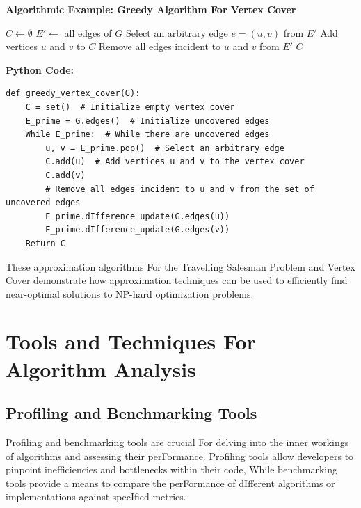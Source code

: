 \documentclass[12pt]{book} %
\begin{document}
\textbf{Algorithmic Example: Greedy Algorithm For Vertex Cover}

\begin{algorithm}
\caption{Greedy Algorithm For Vertex Cover}
\begin{algorithmic}[1]
    \State $C \gets \emptyset$ 
    \State $E' \gets$ all edges of $G$ 
        \State Select an arbitrary edge $e = (u, v)$ from $E'$
        \State Add vertices $u$ and $v$ to $C$
        \State Remove all edges incident to $u$ and $v$ from $E'$
    \EndWhile
    \State \Return $C$
\EndFunction
\end{algorithmic}
\end{algorithm}
\textbf{Python Code:}
\FloatBarrier
\begin{verbatim}
def greedy_vertex_cover(G):
    C = set()  # Initialize empty vertex cover
    E_prime = G.edges()  # Initialize uncovered edges
    While E_prime:  # While there are uncovered edges
        u, v = E_prime.pop()  # Select an arbitrary edge
        C.add(u)  # Add vertices u and v to the vertex cover
        C.add(v)
        # Remove all edges incident to u and v from the set of uncovered edges
        E_prime.dIfference_update(G.edges(u))
        E_prime.dIfference_update(G.edges(v))
    Return C
\end{verbatim}
\FloatBarrier
These approximation algorithms For the Travelling Salesman Problem and Vertex Cover demonstrate how approximation techniques can be used to efficiently find near-optimal solutions to NP-hard optimization problems.


\section{Tools and Techniques For Algorithm Analysis}
\subsection{Profiling and Benchmarking Tools}

Profiling and benchmarking tools are crucial For delving into the inner workings of algorithms and assessing their perFormance. Profiling tools allow developers to pinpoint inefficiencies and bottlenecks within their code, While benchmarking tools provide a means to compare the perFormance of dIfferent algorithms or implementations against specIfied metrics.
\end{document}

